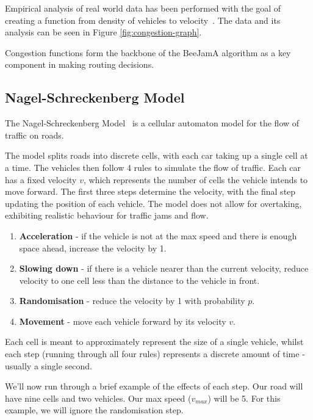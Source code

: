 \documentclass[ %
                    author={Alexander Hill},
                supervisor={Dr. Benjamin Sach},
                    degree={MEng},
                     title={MARMOSET},
                  subtitle={Multi-Agent Route Management using Online Simulation for Efficient Transportation},
                      type={research},
                      year={2016} ]{dissertation}
\begin{document}
Empirical analysis of real world data has been performed with the goal of
creating a function from density of vehicles to velocity~\cite{traffic-graphs,
traffic-thing-2}. The data and its analysis can be seen in Figure
\ref{fig:congestion-graph}.

Congestion functions form the backbone of the BeeJamA algorithm as a key
component in making routing decisions.

\subsection{Nagel-Schreckenberg Model} \label{sec:nagel}

The Nagel-Schreckenberg Model~\cite{nagel} is a cellular automaton model for the
flow of traffic on roads.

The model splits roads into discrete cells, with each car taking up a single
cell at a time. The vehicles then follow 4 rules to simulate the flow of
traffic. Each car has a fixed velocity $v$, which represents the number of cells
the vehicle intends to move forward. The first three steps determine the
velocity, with the final step updating the position of each vehicle.  The model
does not allow for overtaking, exhibiting realistic behaviour for traffic jams
and flow.

\begin{enumerate}
    \item \textbf{Acceleration} - if the vehicle is not at the max speed and
        there is enough space ahead, increase the velocity by 1.
    \item \textbf{Slowing down} - if there is a vehicle nearer than the current
        velocity, reduce velocity to one cell less than the distance to the
        vehicle in front.
    \item \textbf{Randomisation} - reduce the velocity by 1 with probability
        $p$.
    \item \textbf{Movement} - move each vehicle forward by its velocity $v$.
\end{enumerate}

Each cell is meant to approximately represent the size of a single vehicle,
whilst each step (running through all four rules) represents a discrete amount
of time - usually a single second.

We'll now run through a brief example of the effects of each step. Our road will
have nine cells and two vehicles. Our max speed ($v_{max}$) will be 5.  For this
example, we will ignore the randomisation step.
\end{document}
